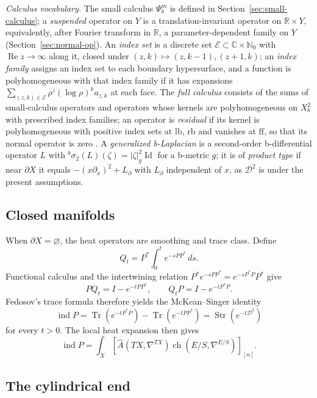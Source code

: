 \documentclass[12pt,oneside,reqno]{article}
\DeclareMathOperator{\Tr}{Tr}
\theoremstyle{plain}
\theoremstyle{definition}
\theoremstyle{remark}
\begin{document}
\emph{Calculus vocabulary.} The small calculus \(\Psi_b^m\) is defined in
Section~\ref{sec:small-calculus}; a \emph{suspended} operator on \(Y\) is
a translation-invariant operator on \(\mathbb R\times Y\), equivalently,
after Fourier transform in \(\mathbb R\), a parameter-dependent family on
\(Y\) (Section~\ref{sec:normal-op}). An \emph{index set} is a discrete set
\(\mathcal E\subset\mathbb C\times\mathbb N_0\) with
\(\operatorname{Re}z\to\infty\) along it, closed under
\((z,k)\mapsto(z,k-1),(z+1,k)\); an \emph{index family} assigns an index
set to each boundary hypersurface, and a function is polyhomogeneous with
that index family if it has expansions
\(\sum_{(z,k)\in\mathcal E}\rho^z(\log\rho)^ka_{z,k}\) at each face. The
\emph{full calculus} consists of the sums of small-calculus operators and
operators whose kernels are polyhomogeneous on \(X_b^2\) with prescribed
index families; an operator is \emph{residual} if its kernel is
polyhomogeneous with positive index sets at \(\mathrm{lb}\), \(\mathrm{rb}\)
and vanishes at \(\mathrm{ff}\), so that its normal operator is zero
\cite[Chapters~4--5]{Melrose}. A \emph{generalized b-Laplacian} is a
second-order b-differential operator \(L\) with
\({}^b\sigma_2(L)(\zeta)=|\zeta|^2_g\operatorname{Id}\) for a b-metric
\(g\); it is of \emph{product type} if near \(\partial X\) it equals
\(-(x\partial_x)^2+L_\partial\) with \(L_\partial\) independent of \(x\),
as \(\mathcal D^2\) is under the present assumptions.

\subsection{Closed manifolds}

When $\partial X=\varnothing$, the heat operators are smoothing and
trace class. Define
\[
 Q_t=P^*\int_0^t e^{-sPP^*}\,ds.
\]
Functional calculus and the intertwining relation
$P^*e^{-sPP^*}=e^{-sP^*P}P^*$ give
\[
 PQ_t=I-e^{-tPP^*},
 \qquad
 Q_tP=I-e^{-tP^*P}.
\]
Fedosov's trace formula therefore yields the McKean--Singer identity
\[
 \operatorname{ind}P
 =\Tr(e^{-tP^*P})-\Tr(e^{-tPP^*})
 =\operatorname{Str}(e^{-t\mathcal D^2})
\]
for every $t>0$. The local heat expansion then gives
\[
 \operatorname{ind}P
 =\int_X
 \left[
 \widehat A(TX,\nabla^{TX})
 \operatorname{ch}(E/S,\nabla^{E/S})
 \right]_{[n]}.
\]

\subsection{The cylindrical end}
\end{document}
